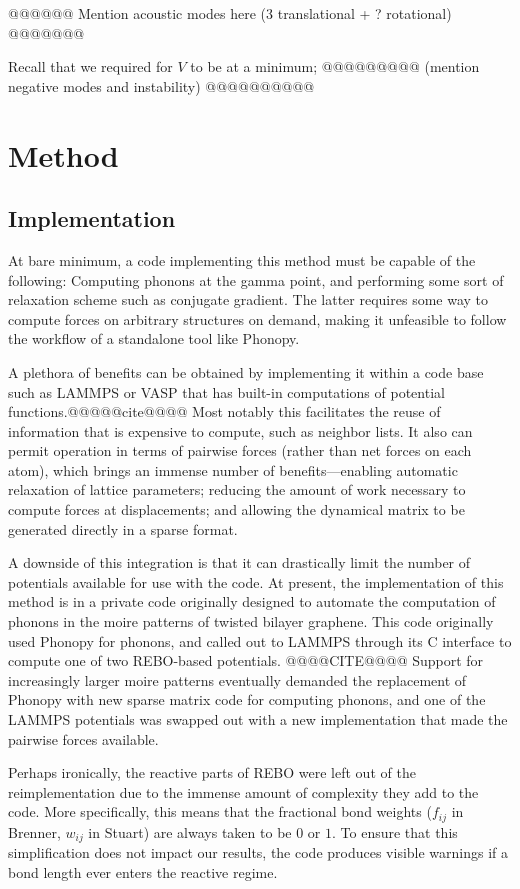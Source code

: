 \documentclass[11pt]{article}
\theoremstyle{definition}
\theoremstyle{remark}
\begin{document}
@@@@@@ Mention acoustic modes here (3 translational + ? rotational) @@@@@@@

Recall that we required for $V$ to be at a minimum; @@@@@@@@@ (mention negative modes and instability) @@@@@@@@@@

\section{Method}



\subsection{Implementation}

At bare minimum, a code implementing this method must be capable of the following:  Computing phonons at the gamma point, and performing some sort of relaxation scheme such as conjugate gradient.  The latter requires some way to compute forces on arbitrary structures on demand, making it unfeasible to follow the workflow of a standalone tool like Phonopy.

A plethora of benefits can be obtained by implementing it within a code base such as LAMMPS or VASP that has built-in computations of potential functions.@@@@@cite@@@@  Most notably this facilitates the reuse of information that is expensive to compute, such as neighbor lists.  It also can permit operation in terms of pairwise forces (rather than net forces on each atom), which brings an immense number of benefits---enabling automatic relaxation of lattice parameters; reducing the amount of work necessary to compute forces at displacements; and allowing the dynamical matrix to be generated directly in a sparse format.

A downside of this integration is that it can drastically limit the number of potentials available for use with the code.  At present, the implementation of this method is in a private code originally designed to automate the computation of phonons in the moire patterns of twisted bilayer graphene.  This code originally used Phonopy for phonons, and called out to LAMMPS through its C interface to compute one of two REBO-based potentials. @@@@CITE@@@@ Support for increasingly larger moire patterns eventually demanded the replacement of Phonopy with new sparse matrix code for computing phonons, and one of the LAMMPS potentials was swapped out with a new implementation that made the pairwise forces available.

Perhaps ironically, the reactive parts of REBO were left out of the reimplementation
due to the immense amount of complexity they add to the code.
More specifically, this means that the fractional bond weights ($f_{ij}$ in Brenner, $w_{ij}$ in Stuart)
are always taken to be $0$ or $1$.
To ensure that this simplification does not impact our results,
the code produces visible warnings if a bond length ever enters the reactive regime.
\end{document}
